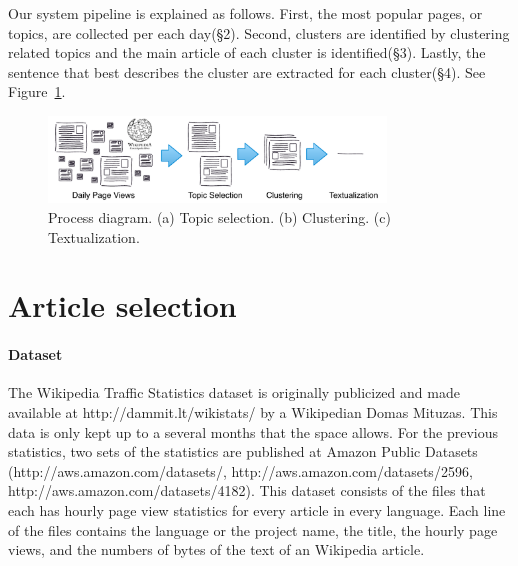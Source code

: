 \documentclass[11pt]{article}
\begin{document}



Our system pipeline is explained as follows. First, the most popular pages, or topics, are collected per each day(\S2). Second, clusters are identified by clustering related topics and the main article of each cluster is identified(\S3). Lastly, the sentence that best describes the cluster are extracted for each cluster(\S4). See Figure~\ref{fig:process}.

\begin{figure}
\centering
\includegraphics[width=0.8\textwidth]{figures/WikiTopicsPipeline.pdf}
\caption{Process diagram. (a) Topic selection. (b) Clustering. (c) Textualization.}
\label{fig:process}
\end{figure}

\section{Article selection}
\paragraph{Dataset}
The Wikipedia Traffic Statistics dataset is originally publicized and made available at http://dammit.lt/wikistats/ by a Wikipedian Domas Mituzas.
This data is only kept up to a several months that the space allows.
For the previous statistics, two sets of the statistics are published at Amazon Public Datasets (http://aws.amazon.com/datasets/, http://aws.amazon.com/datasets/2596, http://aws.amazon.com/datasets/4182).
This dataset consists of the files that each has hourly page view statistics for every article in every language.
Each line of the files contains the language or the project name, the title, the hourly page views, and the numbers of bytes of the text of an Wikipedia article.
\end{document}
